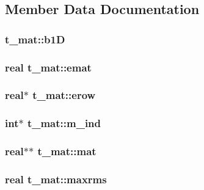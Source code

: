 \subsection{\-Member \-Data \-Documentation}
\hypertarget{structt__mat_ac931cade445db52de3c635ad6dad3527}{
\subsubsection[{b1\-D}]{ {\bf t\-\_\-mat\-::b1\-D}}}\label{structt__mat_ac931cade445db52de3c635ad6dad3527}
\hypertarget{structt__mat_a17987a9b399f03d86e70266977803fa3}{
\subsubsection[{emat}]{\setlength{\rightskip}{0pt plus 5cm}real {\bf t\-\_\-mat\-::emat}}}\label{structt__mat_a17987a9b399f03d86e70266977803fa3}
\hypertarget{structt__mat_a33f5d05e52771b10923a3c7c81a45f13}{
\subsubsection[{erow}]{\setlength{\rightskip}{0pt plus 5cm}real$\ast$ {\bf t\-\_\-mat\-::erow}}}\label{structt__mat_a33f5d05e52771b10923a3c7c81a45f13}
\hypertarget{structt__mat_a57e34c5d249b5ac5151898196eb89ddc}{
\subsubsection[{m\-\_\-ind}]{\setlength{\rightskip}{0pt plus 5cm}int$\ast$ {\bf t\-\_\-mat\-::m\-\_\-ind}}}\label{structt__mat_a57e34c5d249b5ac5151898196eb89ddc}
\hypertarget{structt__mat_a073cd1d6040413069387ff67ddab647e}{
\subsubsection[{mat}]{\setlength{\rightskip}{0pt plus 5cm}real$\ast$$\ast$ {\bf t\-\_\-mat\-::mat}}}\label{structt__mat_a073cd1d6040413069387ff67ddab647e}
\hypertarget{structt__mat_aa1c488540c1687ca49953d76abee1b9e}{
\subsubsection[{maxrms}]{\setlength{\rightskip}{0pt plus 5cm}real {\bf t\-\_\-mat\-::maxrms}}}\label{structt__mat_aa1c488540c1687ca49953d76abee1b9e}
